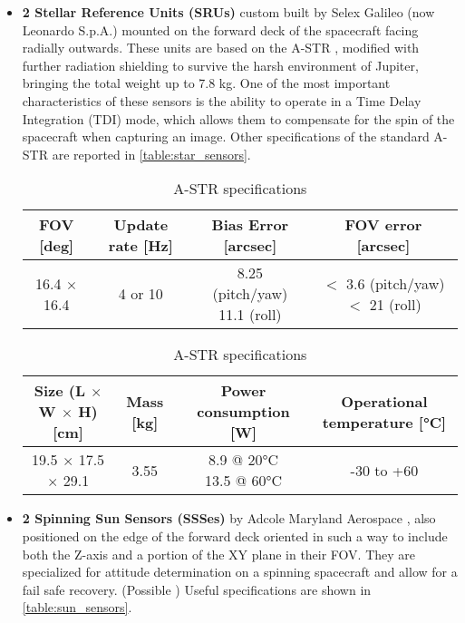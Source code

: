 \begin{itemize}
    \item \textbf{2 Stellar Reference Units (SRUs)} custom built by Selex Galileo (now Leonardo S.p.A.) mounted on the forward deck of the spacecraft facing radially outwards. These units are based on the A-STR \cite{SRU}, modified with further radiation shielding to survive the harsh environment of Jupiter, bringing the total weight up to 7.8 kg. One of the most important characteristics of these sensors is the ability to operate in a Time Delay Integration (TDI) mode, which allows them to compensate for the spin of the spacecraft when capturing an image. Other specifications of the standard A-STR are reported in \autoref{table:star_sensors}.
    \begin{table}[H]
        \renewcommand{\arraystretch}{1.3}
        \centering
        \begin{tabular}{|c|c|c|c|}
            \hline
            \textbf{FOV [deg]} & \textbf{Update rate [Hz]} & \textbf{Bias Error [arcsec]} & \textbf{FOV error [arcsec]} \\
            \hline
            \hline
            16.4 $\times$ 16.4 & 4 or 10 & \makecell{8.25 (pitch/yaw) \\ 11.1 (roll)} & \makecell{$<$ 3.6 (pitch/yaw) \\ $<$ 21 (roll)} \\   
            \hline
        \end{tabular}

        \vspace{5mm}

        \begin{tabular}{|c|c|c|c|}
            \hline
            \textbf{Size (L $\boldsymbol{\times}$ W $\boldsymbol{\times}$ H) [cm]} & \textbf{Mass [kg]} & \textbf{Power consumption [W]} & \textbf{Operational temperature [°C]} \\
            \hline
            \hline
            19.5 $\times$ 17.5 $\times$ 29.1 & 3.55 & \makecell{8.9 @ 20°C \\ 13.5 @ 60°C} & -30 to +60\\
            \hline
        \end{tabular}
        \caption{A-STR specifications}
        \label{table:star_sensors}
    \end{table}
    
    \item \textbf{2 Spinning Sun Sensors (SSSes)} by Adcole Maryland Aerospace \cite{SSS}, also positioned on the edge of the forward deck oriented in such a way to include both the Z-axis and a portion of the XY plane in their FOV. They are specialized for attitude determination on a spinning spacecraft and allow for a fail safe recovery. (Possible \mref) Useful specifications are shown in \autoref{table:sun_sensors}.
    

\end{itemize}
